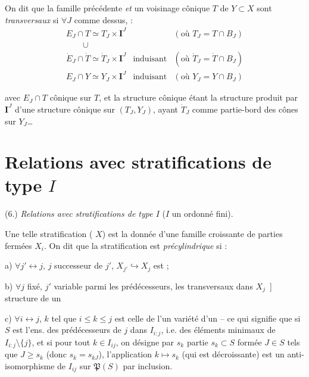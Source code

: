 \documentclass[11pt,a4paper]{article}
\begin{document}
On dit que la famille précédente \emph{et} un voisinage cônique $T$ de $Y\subset X$ sont \emph{transversaux} si  $\forall J$ \struck{\ill{}} comme dessus,  :
\[
\begin{array}{lll}
E_J\cap T\simeq T_J\times\mathbf{I}^J & & (\text{où } T_J=T\cap B_J)\\
\qquad\cup & & \\
\dot E_J\cap\dot T\simeq\dot T_J\times\mathbf{I}^J & \text{induisant} & (\text{où } \dot T_J=\dot T\cap B_J)\\
E_J\cap Y\simeq Y_J\times\mathbf{I}^J & \text{induisant} & (\text{où } Y_J=Y\cap B_J)
\end{array}
\]


avec $E_J\cap T$ cônique sur $T$, et la structure cônique  étant la structure produit par $\mathbf{I}^J$ d'une structure cônique sur $(T_J,Y_J)$, ayant $\dot T_J$ comme partie-bord des cônes sur $Y_J$\ldots

\section*{Relations avec stratifications de type $I$}

(6.) \emph{Relations avec stratifications de type $I$} ($I$ un ordonné fini).

Une telle stratification (\struck{\ill{}}  $X$) est la donnée d'une famille croissante de parties fermées $X_i$. On dit que la stratification est \emph{précylindrique} si :

a) $\forall j'\leftrightarrow j$, $j$ successeur de $j'$, $X_{j'}\hookrightarrow X_j$ est  ;

b)  $\forall j$ fixé, $j'$ variable parmi les prédécesseurs, les \ill{} transversaux \ill{} dans $X_j$ \,]  structure de \ill{} un

c) $\forall i\leftrightarrow j$, \ill{} \ill{} \ill{} $k$ tel que $i\le k\le j$ est celle de l'un variété d'un   -- ce qui signifie que si $S$ est l'ens. des prédécesseurs de $j$ dans $I_{i:j}$, i.e. des éléments minimaux de $I_{i:j}\setminus\lbrace j\rbrace$, et si pour tout $k\in I_{ij}$, on désigne par $s_k$ \struck{\ill{}}  partie $s_k\subset S$ formée  $J\in S$ tels que $J\ge s_k$ (donc $s_k=s_{kJ}$), l'application $k\longmapsto s_k$ (qui est décroissante)  est un anti-isomorphisme de $I_{ij}$ sur $\mathfrak P(S)$ \struck{\ill{}}  par inclusion.
\end{document}
